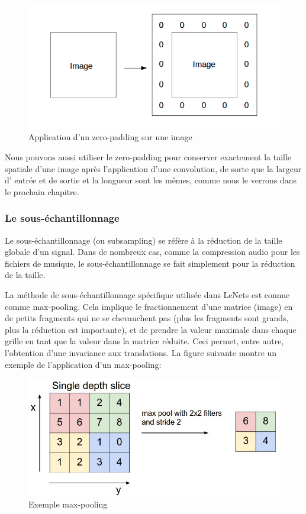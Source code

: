 \begin{figure}[H]
	\centering
		\includegraphics[width=5in]{Figures/zero-padding.png}
	\caption[An Electron]{Application d'un zero-padding sur une image}
	\label{fig:Electron}
\end{figure}

Nous pouvons aussi utiliser le zero-padding pour conserver exactement la taille spatiale d'une image après l'application d'une convolution, de sorte que la largeur d' entrée et de sortie et la longueur sont les mêmes, comme nous le verrons dans le prochain chapitre.


\subsubsection{Le sous-échantillonnage}
Le sous-échantillonnage (ou subsampling) se réfère à la réduction de la taille globale d'un signal. Dans de nombreux cas, comme la compression audio pour les fichiers de musique, le sous-échantillonnage se fait simplement pour la réduction de la taille. 

La méthode de sous-échantillonnage spécifique utilisée dans LeNets est connue comme max-pooling. Cela implique le fractionnement d'une matrice (image) en de petits fragments qui ne se chevauchent pas (plus les fragments sont grands, plus la réduction est importante), et de prendre la valeur maximale dans chaque grille en tant que la valeur dans la matrice réduite. 
Ceci permet, entre autre, l'obtention d'une invariance aux translations. La figure suivante montre un exemple de l'application d'un max-pooling:


\begin{figure}[H]
	\centering
		\includegraphics[width=5in]{Figures/maxpool.jpeg}
	\caption[MP]{Exemple max-pooling}
	\label{fig:Electron}
\end{figure}

